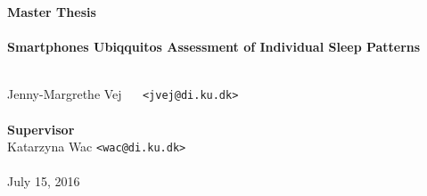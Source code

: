 \documentclass[a4paper,oneside]{memoir}
\begin{document}
    \thispagestyle{empty}
    \begin{adjustwidth}{-3cm}{-1.5cm}
    \vspace*{1cm}
    \textbf{\Huge Master Thesis} \\
    \vspace*{2.5cm} \\
    \textbf{\huge Smartphones Ubiqquitos Assessment of Individual Sleep Patterns} \\
    \vspace*{.1cm} \\
    \begin{tabbing}
    Jenny-Margrethe Vej ~~ \= \texttt{<jvej@di.ku.dk>} \\
    \\[11.7cm]
    \textbf{\Large Supervisor} \\
    Katarzyna Wac\> \texttt{<wac@di.ku.dk>} \\
    \vspace*{.1cm} \\
    July 15, 2016
    \end{tabbing}
    \end{adjustwidth}
    \ClearWallPaper
\end{document}
